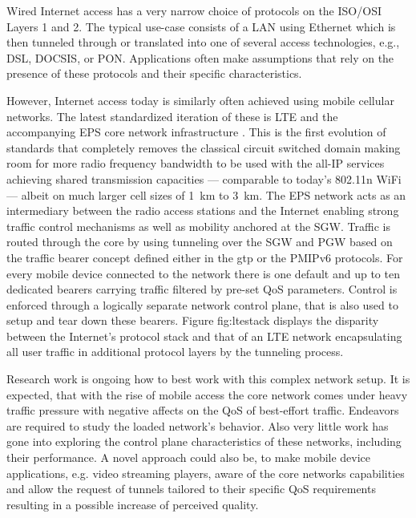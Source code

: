 Wired Internet access has a very narrow choice of protocols on the \gls{ISO}/\gls{OSI} Layers 1 and 2. The typical use-case consists of a \gls{LAN} using Ethernet which is then tunneled through or translated into one of several access technologies, e.g., \gls{DSL}, \gls{DOCSIS}, or \gls{PON}. Applications often make assumptions that rely on the presence of these protocols and their specific characteristics.

However, Internet access today is similarly often achieved using mobile cellular networks. The latest standardized iteration of these is \gls{LTE} and the accompanying \gls{EPS} core network infrastructure \cite{olsson2009sae}. This is the first evolution of standards that completely removes the classical circuit switched domain making room for more radio frequency bandwidth to be used with the all-\gls{IP} services achieving shared transmission capacities --- comparable to today's 802.11n WiFi --- albeit on much larger cell sizes of \SI{1}{\kilo\meter} to \SI{3}{\kilo\meter}. The \gls{EPS} network acts as an intermediary between the radio access stations and the Internet enabling strong traffic control mechanisms as well as mobility anchored at the \gls{SGW}. Traffic is routed through the core by using tunneling over the \gls{SGW} and \gls{PGW} based on the traffic bearer concept defined either in the \gls{gtp} or the \gls{PMIPv6} protocols. For every mobile device connected to the network there is one default and up to ten dedicated bearers carrying traffic filtered by pre-set \gls{QoS} parameters. Control is enforced through a logically separate network control plane, that is also used to setup and tear down these bearers. Figure fig:ltestack displays the disparity between the Internet's protocol stack and that of an \gls{LTE} network encapsulating all user traffic in additional protocol layers by the tunneling process.

Research work is ongoing how to best work with this complex network setup. It is expected, that with the rise of mobile access the core network comes under heavy traffic pressure with negative affects on the \gls{QoS} of best-effort traffic. Endeavors are required to study the loaded network's behavior. Also very little work has gone into exploring the control plane characteristics of these networks, including their performance. A novel approach could also be, to make mobile device applications, e.g. video streaming players, aware of the core networks capabilities and allow the request of tunnels tailored to their specific \gls{QoS} requirements resulting in a possible increase of perceived quality.

